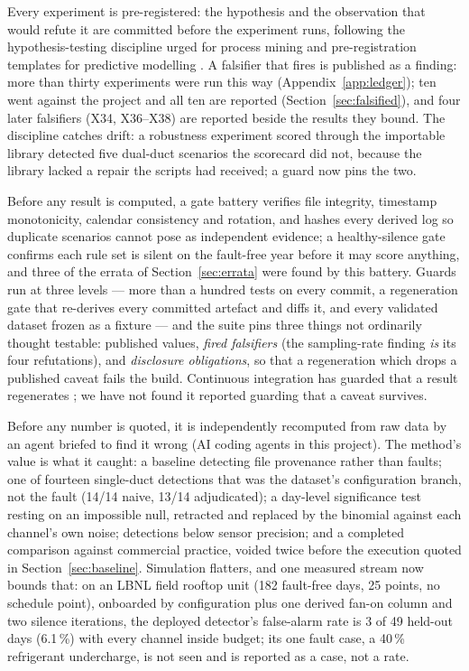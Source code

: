 \documentclass[11pt,letterpaper]{article}
\begin{document}
Every experiment is pre-registered: the hypothesis and the observation that would refute it are committed before the experiment runs, following the hypothesis-testing discipline urged for process mining \cite{pitsch2025hypothesistesting} and pre-registration templates for predictive modelling \cite{hofman2023preregistration,pawel2022pitfalls}. A falsifier that fires is published as a finding: more than thirty experiments were run this way (Appendix~\ref{app:ledger}); ten went against the project and all ten are reported (Section~\ref{sec:falsified}), and four later falsifiers (X34, X36--X38) are reported beside the results they bound. The discipline catches drift: a robustness experiment scored through the importable library detected five dual-duct scenarios the scorecard did not, because the library lacked a repair the scripts had received; a guard now pins the two.

Before any result is computed, a gate battery verifies file integrity, timestamp monotonicity, calendar consistency and rotation, and hashes every derived log so duplicate scenarios cannot pose as independent evidence; a healthy-silence gate confirms each rule set is silent on the fault-free year before it may score anything, and three of the errata of Section~\ref{sec:errata} were found by this battery. Guards run at three levels --- more than a hundred tests on every commit, a regeneration gate that re-derives every committed artefact and diffs it, and every validated dataset frozen as a fixture --- and the suite pins three things not ordinarily thought testable: published values, \emph{fired falsifiers} (the sampling-rate finding \emph{is} its four refutations), and \emph{disclosure obligations}, so that a regeneration which drops a published caveat fails the build. Continuous integration has guarded that a result regenerates \cite{jimenez2017popper}; we have not found it reported guarding that a caveat survives.

Before any number is quoted, it is independently recomputed from raw data by an agent briefed to find it wrong (AI coding agents in this project). The method's value is what it caught: a baseline detecting file provenance rather than faults; one of fourteen single-duct detections that was the dataset's configuration branch, not the fault (14/14 naive, 13/14 adjudicated); a day-level significance test resting on an impossible null, retracted and replaced by the binomial against each channel's own noise; detections below sensor precision; and a completed comparison against commercial practice, voided twice before the execution quoted in Section~\ref{sec:baseline}. Simulation flatters, and one measured stream now bounds that: on an LBNL field rooftop unit (182 fault-free days, 25 points, no schedule point), onboarded by configuration plus one derived fan-on column and two silence iterations, the deployed detector's false-alarm rate is 3 of 49 held-out days (6.1\,\%) with every channel inside budget; its one fault case, a 40\,\% refrigerant undercharge, is not seen and is reported as a case, not a rate.
\end{document}
